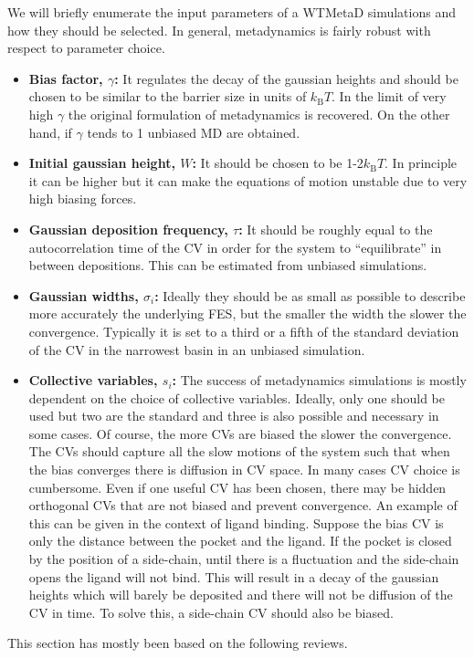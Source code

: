 We will briefly enumerate the input parameters of a WTMetaD simulations and how they 
should be selected. In general, metadynamics is fairly robust with respect to parameter choice.
\begin{itemize}
 \item \textbf{Bias factor, $\gamma$:} It regulates the decay of the gaussian heights and 
should be chosen to be similar to the barrier size in units of $k_\text{B}T$. In the limit of 
very 
high $\gamma$ the original formulation of metadynamics is recovered. On the other hand, if $\gamma$ 
tends to 1 unbiased MD are obtained.
\item \textbf{Initial gaussian height, $W$:} It should be chosen to be 1-2$k_\text{B}T$. In 
principle 
it can be higher but it can make the equations of motion unstable due to very high biasing 
forces.
\item \textbf{Gaussian deposition frequency, $\tau$:} It should be roughly equal to the 
autocorrelation time of the CV in order for the system to ``equilibrate'' in between 
depositions. This can be estimated from unbiased simulations.
\item \textbf{Gaussian widths, $\sigma_i$:} Ideally they should be as small as possible to describe 
more accurately the underlying FES, but the smaller the width the slower the convergence. Typically 
it is set to a third or a fifth of the standard deviation of the CV in the narrowest basin in an 
unbiased simulation.
\item \textbf{Collective variables, $s_i$:} The success of metadynamics simulations is mostly 
dependent on the choice of collective variables. Ideally, only one should be used but two are 
the standard and three is also possible and necessary in some cases. Of course, the more CVs are 
biased the slower the convergence. The CVs should capture all the slow motions of the system such 
that when the bias converges there is diffusion in CV space. In many cases CV choice is cumbersome. 
Even if one useful CV has been chosen, there may be hidden orthogonal CVs that are not biased and 
prevent convergence. An example of this can be given in the context of ligand binding. Suppose the 
bias CV is only the distance between the pocket and the ligand. If the pocket is closed by the 
position of a side-chain, until there is a fluctuation and the side-chain opens the ligand will not 
bind. This will result in a decay of the gaussian heights which will barely be deposited and there 
will not be diffusion of the CV in time. To solve this, a side-chain CV should also be
biased. 
\end{itemize}

This section has mostly been based on the following 
reviews\cite{bussi2015free_v2,Valsson2016,Barducci2011}.



